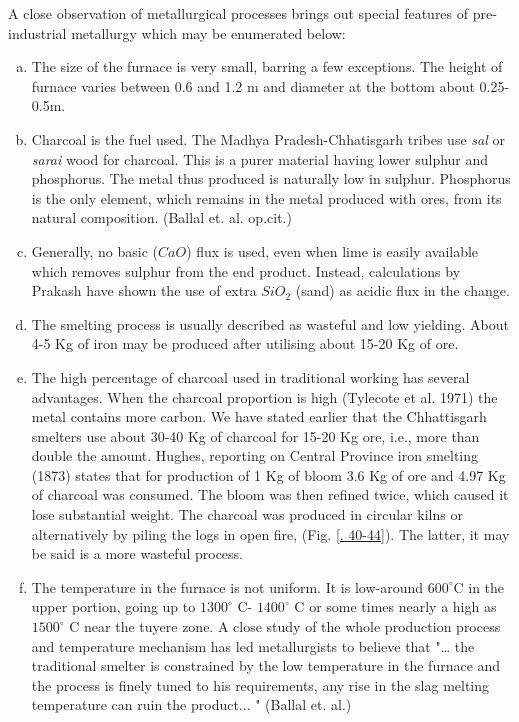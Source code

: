 A close observation of metallurgical processes brings out special features of pre-industrial metallurgy which may be enumerated below:

\begin{enumerate}[a)]
\item The size of the furnace is very small, barring a few exceptions. The height of furnace varies between 0.6 and 1.2 m and diameter at the bottom about 0.25-0.5m.
\item Charcoal is the fuel used. The Madhya Pradesh-Chhatisgarh tribes use {\it sal} or {\it sarai} wood for charcoal. This is a purer material having lower sulphur and phosphorus. The metal thus produced is naturally low in sulphur. Phosphorus is the only element, which remains in the metal produced with ores, from its natural composition. (Ballal et. al. op.cit.)  	
\item Generally, no basic ($CaO$) flux is used, even when lime is easily available which removes sulphur from the end product. Instead, calculations by Prakash have shown the use of extra $SiO_2$ (sand) as acidic flux in the change.
\item The smelting process is usually described as wasteful and low yielding. About 4-5 Kg of iron may be produced after utilising about 15-20 Kg of ore.
\item The high percentage of charcoal used in traditional working has several advantages. When the charcoal proportion is high (Tylecote et al. 1971) the metal contains more carbon. We have stated earlier that the Chhattisgarh smelters use about 30-40 Kg of charcoal for 15-20 Kg ore, i.e., more than double the amount. Hughes, reporting on Central Province iron smelting (1873) states that for production of 1 Kg of bloom 3.6 Kg of ore and 4.97 Kg of charcoal was consumed. The bloom was then refined twice, which caused it lose substantial weight. The charcoal was produced in circular kilns or alternatively by piling the logs in open fire, (Fig. \ref{. 40-44}). The latter, it may be said is a more wasteful process.
\item The temperature in the furnace is not uniform. It is low-around $600^\circ$C in the upper portion, going up to $1300^\circ$ C- $1400^\circ$ C or some times nearly a high as $1500^\circ$ C near the tuyere zone. A close study of the whole production process and temperature mechanism has led metallurgists to believe that "… the traditional smelter is constrained by the low temperature in the furnace and the process is finely tuned to his requirements, any rise in the slag melting temperature can ruin the product... " (Ballal et. al.) 

\end{enumerate}
